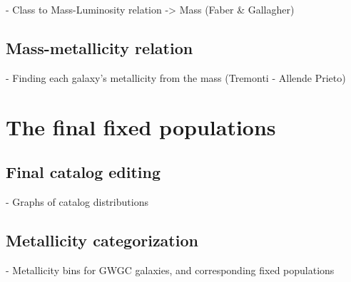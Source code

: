     - Class to Mass-Luminosity relation -> Mass (Faber \& Gallagher)

\subsection{Mass-metallicity relation}

    - Finding each galaxy's metallicity from the mass (Tremonti - Allende Prieto)


\section{The final fixed populations}

\subsection{Final catalog editing}

    - Graphs of catalog distributions

\subsection{Metallicity categorization}

    - Metallicity bins for GWGC galaxies, and corresponding fixed populations


